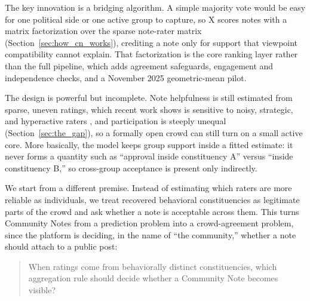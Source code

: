 \documentclass[10pt,twocolumn]{article}
\begin{document}
The key innovation is a bridging algorithm. A simple majority vote would be easy
for one political side or one active group to capture, so X scores notes with a
matrix factorization over the sparse note-rater matrix
(Section~\ref{sec:how_cn_works}), crediting a note only for support that
viewpoint compatibility cannot explain. That factorization is the core ranking
layer rather than the full pipeline, which adds agreement safeguards,
engagement and independence checks, and a November 2025 geometric-mean pilot.

The design is powerful but incomplete. Note helpfulness is still estimated from
sparse, uneven ratings, which recent work shows is sensitive to noisy,
strategic, and hyperactive raters \citep{goyal2026qsmf,nudo2026hyperactive},
and participation is steeply unequal (Section~\ref{sec:the_gap}), so a formally
open crowd can still turn on a small active core. More basically, the model
keeps group support inside a fitted estimate: it never forms a quantity such as
``approval inside constituency A'' versus ``inside constituency B,'' so
cross-group acceptance is present only indirectly.

We start from a different premise. Instead of estimating which raters are more
reliable as individuals, we treat recovered behavioral constituencies as
legitimate parts of the crowd and ask whether a note is acceptable across them.
This turns Community Notes from a prediction problem into a crowd-agreement
problem, since the platform is deciding, in the name of ``the community,''
whether a note should attach to a public post:

\begin{quote}
When ratings come from behaviorally distinct constituencies, which aggregation
rule should decide whether a Community Note becomes visible?
\end{quote}
\end{document}
